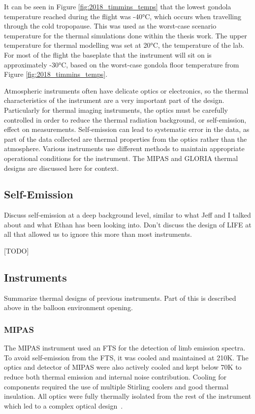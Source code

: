 It can be seen in Figure \ref{fig:2018_timmins_temps} that the lowest gondola temperature reached during the flight was -40°C, which occurs when travelling through the cold tropopause. This was used as the worst-case scenario temperature for the thermal simulations done within the thesis work. The upper temperature for thermal modelling was set at 20°C, the temperature of the lab. For most of the flight the baseplate that the instrument will sit on is approximately -30°C, based on the worst-case gondola floor temperature from Figure \ref{fig:2018_timmins_temps}. 

Atmospheric instruments often have delicate optics or electronics, so the thermal characteristics of the instrument are a very important part of the design. Particularly for thermal imaging instruments, the optics must be carefully controlled in order to reduce the thermal radiation background, or self-emission, effect on measurements. Self-emission can lead to systematic error in the data, as part of the data collected are thermal properties from the optics rather than the atmosphere. Various instruments use different methods to maintain appropriate operational conditions for the instrument. The MIPAS and GLORIA thermal designs are discussed here for context. 

\subsection{Self-Emission}
Discuss self-emission at a deep background level, similar to what Jeff and I talked about and what Ethan has been looking into. Don't discuss the design of LIFE at all that allowed us to ignore this more than most instruments.

[TODO]

\subsection{Instruments} \label{GLORIA_MIPAS_thermal}
Summarize thermal designs of previous instruments. Part of this is described above in the balloon environment opening.

\subsubsection{MIPAS}
The MIPAS instrument used an FTS for the detection of limb emission spectra. To avoid self-emission from the FTS, it was cooled and maintained at 210K. The optics and detector of MIPAS were also actively cooled and kept below 70K to reduce both thermal emission and internal noise contribution. Cooling for components required the use of multiple Stirling coolers and good thermal insulation. All optics were fully thermally isolated from the rest of the instrument which led to a complex optical design~\citep{MIPAS_instrument}.

